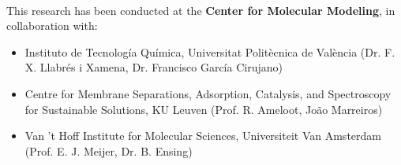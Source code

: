 \documentclass[10pt,twoside]{book}
\begin{document}
                   

\newpage\null\thispagestyle{empty}\newpage
\thispagestyle{empty}
\noindent
\\
\vfill
{\small
\noindent \textsf{This research has been conducted at the \textbf{Center for
Molecular Modeling},} \noindent \textsf{in collaboration with:} \\
\begin{itemize}
\item 
Instituto de Tecnolog\'{i}a Qu\'{i}mica, Universitat Polit\`ecnica de Val\`encia
(Dr. F. X. Llabr\'es i Xamena, Dr. Francisco Garc\'{i}a Cirujano)
\item
Centre for Membrane Separations, Adsorption, Catalysis, and Spectroscopy for Sustainable Solutions, KU Leuven (Prof. R. Ameloot, Jo\~ao Marreiros)
\item
Van 't Hoff Institute for Molecular Sciences, Universiteit Van Amsterdam (Prof. E. J. Meijer, Dr. B. Ensing)
\end{itemize}
}

\newpage %
\thispagestyle{empty}

\renewcommand{\baselinestretch}{1.2}


\frontmatter
{}
\thispagestyle{empty}

\tableofcontents

    \glsaddall
    
\clearpage{\pagestyle{empty}\cleardoublepage}





\listoffigures
\clearpage{\pagestyle{empty}\cleardoublepage}
\end{document}
